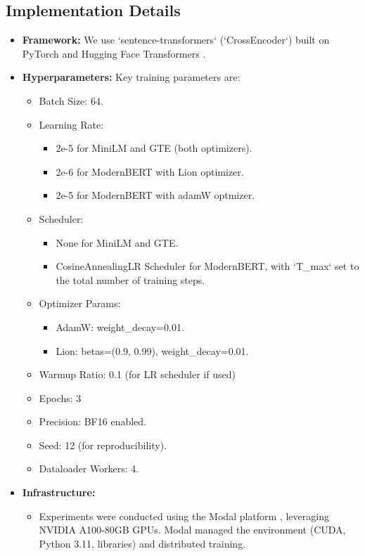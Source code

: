 \documentclass[conference]{IEEEtran}
\begin{document}
\subsection{Implementation Details}
\begin{itemize}
    \item \textbf{Framework:} We use `sentence-transformers` \cite{reimers2019sentence} (`CrossEncoder`) built on PyTorch \cite{paszke2019pytorchimperativestylehighperformance} and Hugging Face Transformers \cite{wolf2020transformers}.
    \item \textbf{Hyperparameters:} Key training parameters are:
        \begin{itemize}
            \item Batch Size: 64.
            \item Learning Rate:
                \begin{itemize}
                    \item 2e-5 for MiniLM and GTE (both optimizers).
                    \item 2e-6 for ModernBERT with Lion optimizer.
                    \item 2e-5 for ModernBERT with adamW optmizer.
                \end{itemize}
            \item Scheduler:
                \begin{itemize}
                    \item None for MiniLM and GTE.
                    \item CosineAnnealingLR Scheduler for ModernBERT, with `T\_max` set to the total number of training steps.
                \end{itemize}
            \item Optimizer Params:
                \begin{itemize}
                    \item AdamW: weight\_decay=0.01.
                    \item Lion: betas=(0.9, 0.99), weight\_decay=0.01.
                \end{itemize}
            \item Warmup Ratio: 0.1 (for LR scheduler if used)
            \item Epochs: 3
            \item Precision: BF16 enabled.
            \item Seed: 12 (for reproducibility).
            \item Dataloader Workers: 4.
        \end{itemize}
    \item \textbf{Infrastructure:} 
    \begin{itemize}
        \item Experiments were conducted using the Modal platform \cite{modal_labs}, leveraging NVIDIA A100-80GB GPUs. Modal managed the environment (CUDA, Python 3.11, libraries) and distributed training.


\end{itemize}
\end{itemize}
\end{document}
